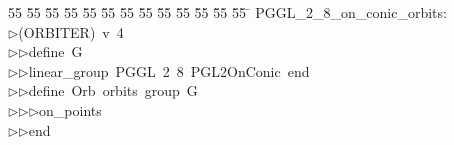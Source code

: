 %
%
\begin{tabbing}
55 \= 55 \= 55 \= 55 \= 55 \= 55 \= 55 \= 55 \= 55 \= 55 \= 55 \= 55 \= 55 \= \kill
PGGL\_2\_8\_on\_conic\_orbits:\\[0pt]
$\triangleright$\>(ORBITER)\ v\ 4\ \\[0pt]
$\triangleright$\>$\triangleright$\>define\ G\ \\[0pt]
$\triangleright$\>$\triangleright$\>linear\_group\ PGGL\ 2\ 8\ PGL2OnConic\ end\ \\[0pt]
$\triangleright$\>$\triangleright$\>define\ Orb\ orbits\ group\ G\ \\[0pt]
$\triangleright$\>$\triangleright$\>$\triangleright$\>on\_points\ \\[0pt]
$\triangleright$\>$\triangleright$\>end\\[0pt]
\end{tabbing}
